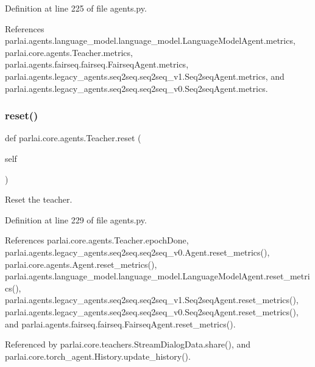 Definition at line 225 of file agents.\+py.



References parlai.\+agents.\+language\+\_\+model.\+language\+\_\+model.\+Language\+Model\+Agent.\+metrics, parlai.\+core.\+agents.\+Teacher.\+metrics, parlai.\+agents.\+fairseq.\+fairseq.\+Fairseq\+Agent.\+metrics, parlai.\+agents.\+legacy\+\_\+agents.\+seq2seq.\+seq2seq\+\_\+v1.\+Seq2seq\+Agent.\+metrics, and parlai.\+agents.\+legacy\+\_\+agents.\+seq2seq.\+seq2seq\+\_\+v0.\+Seq2seq\+Agent.\+metrics.

\mbox{\label{classparlai_1_1core_1_1agents_1_1Teacher_a3b1fe4cf4ea53c9b2ce28435391ad081}} 
\subsubsection{\texorpdfstring{reset()}{reset()}}
{\footnotesize\ttfamily def parlai.\+core.\+agents.\+Teacher.\+reset (\begin{DoxyParamCaption}\item[{}]{self }\end{DoxyParamCaption})}

\begin{DoxyVerb}Reset the teacher.\end{DoxyVerb}
 

Definition at line 229 of file agents.\+py.



References parlai.\+core.\+agents.\+Teacher.\+epoch\+Done, parlai.\+agents.\+legacy\+\_\+agents.\+seq2seq.\+seq2seq\+\_\+v0.\+Agent.\+reset\+\_\+metrics(), parlai.\+core.\+agents.\+Agent.\+reset\+\_\+metrics(), parlai.\+agents.\+language\+\_\+model.\+language\+\_\+model.\+Language\+Model\+Agent.\+reset\+\_\+metrics(), parlai.\+agents.\+legacy\+\_\+agents.\+seq2seq.\+seq2seq\+\_\+v1.\+Seq2seq\+Agent.\+reset\+\_\+metrics(), parlai.\+agents.\+legacy\+\_\+agents.\+seq2seq.\+seq2seq\+\_\+v0.\+Seq2seq\+Agent.\+reset\+\_\+metrics(), and parlai.\+agents.\+fairseq.\+fairseq.\+Fairseq\+Agent.\+reset\+\_\+metrics().



Referenced by parlai.\+core.\+teachers.\+Stream\+Dialog\+Data.\+share(), and parlai.\+core.\+torch\+\_\+agent.\+History.\+update\+\_\+history().

